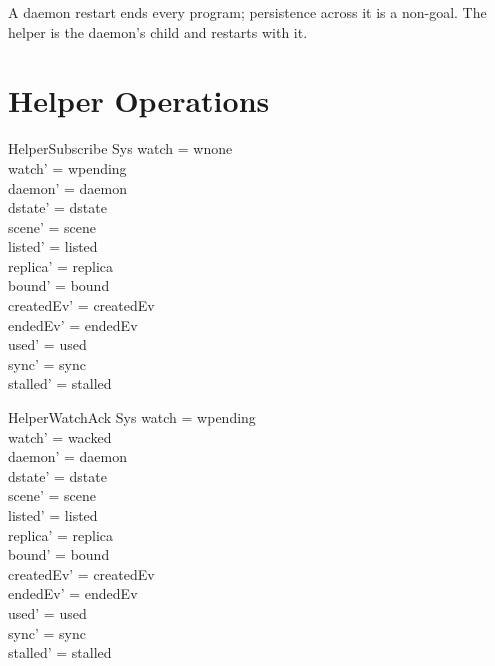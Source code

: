 \documentclass[a4paper,10pt,fleqn]{article}
\begin{document}
A daemon restart ends every program; persistence across it is a
non-goal.  The helper is the daemon's child and restarts with it.

\section{Helper Operations}

\begin{schema}{HelperSubscribe}
  \Delta Sys
\where
  watch = wnone \\
  watch' = wpending \\
  daemon' = daemon \\
  dstate' = dstate \\
  scene' = scene \\
  listed' = listed \\
  replica' = replica \\
  bound' = bound \\
  createdEv' = createdEv \\
  endedEv' = endedEv \\
  used' = used \\
  sync' = sync \\
  stalled' = stalled
\end{schema}

\begin{schema}{HelperWatchAck}
  \Delta Sys
\where
  watch = wpending \\
  watch' = wacked \\
  daemon' = daemon \\
  dstate' = dstate \\
  scene' = scene \\
  listed' = listed \\
  replica' = replica \\
  bound' = bound \\
  createdEv' = createdEv \\
  endedEv' = endedEv \\
  used' = used \\
  sync' = sync \\
  stalled' = stalled
\end{schema}
\end{document}
